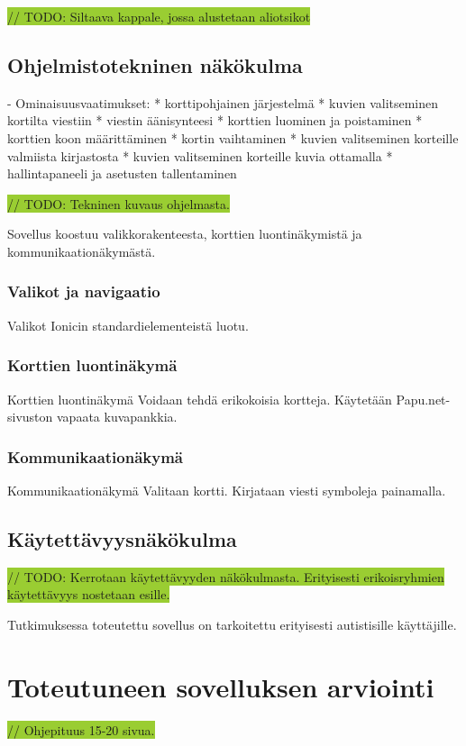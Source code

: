\documentclass[utf8]{gradu3}
\begin{document}
\colorbox{YellowGreen}{// TODO: Siltaava kappale, jossa alustetaan aliotsikot}

\section{Ohjelmistotekninen näkökulma}

- Ominaisuusvaatimukset:
  * korttipohjainen järjestelmä
  * kuvien valitseminen kortilta viestiin
  * viestin äänisynteesi
  * korttien luominen ja poistaminen
  * korttien koon määrittäminen
  * kortin vaihtaminen
  * kuvien valitseminen korteille valmiista kirjastosta
  * kuvien valitseminen korteille kuvia ottamalla
  * hallintapaneeli ja asetusten tallentaminen

\colorbox{YellowGreen}{// TODO: Tekninen kuvaus ohjelmasta.}

Sovellus koostuu valikkorakenteesta, korttien luontinäkymistä ja kommunikaationäkymästä.

\subsection{Valikot ja navigaatio}
Valikot
Ionicin standardielementeistä luotu.

\subsection{Korttien luontinäkymä}
Korttien luontinäkymä
Voidaan tehdä erikokoisia kortteja. Käytetään Papu.net-sivuston vapaata kuvapankkia.

\subsection{Kommunikaationäkymä}
Kommunikaationäkymä
Valitaan kortti. Kirjataan viesti symboleja painamalla.

\section{Käytettävyysnäkökulma}

\colorbox{YellowGreen}{// TODO: Kerrotaan käytettävyyden näkökulmasta. Erityisesti erikoisryhmien käytettävyys nostetaan esille.}

Tutkimuksessa toteutettu sovellus on tarkoitettu erityisesti autistisille käyttäjille.

\chapter{Toteutuneen sovelluksen arviointi}
\colorbox{YellowGreen}{// Ohjepituus 15-20 sivua.}
\end{document}
